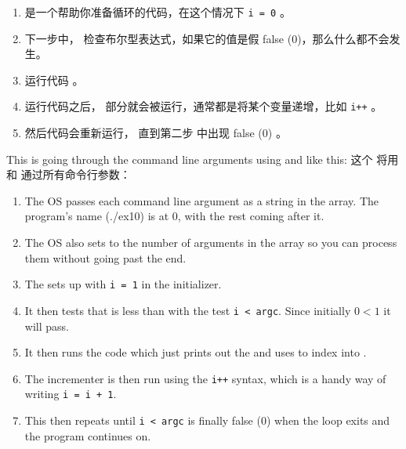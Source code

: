 \begin{enumerate}
\item {} 是一个帮助你准备循环的代码，在这个情况下 \verb|i = 0| 。
\item 下一步中，  检查布尔型表达式，如果它的值是假 false (0)，那么什么都不会发生。
\item 运行代码  。
\item 运行代码之后， 部分就会被运行，通常都是将某个变量递增，比如 \verb|i++| 。
\item 然后代码会重新运行， 直到第二步  中出现 false (0) 。
\end{enumerate}

This  is going through the command line arguments 
using  and  like this:
这个  将用  和  通过所有命令行参数：

\begin{enumerate}
\item The OS passes each command line argument as a string in the 
    array.  The program's name (./ex10) is at 0, with the rest coming after it.
\item The OS also sets  to the number of arguments in the 
    array so you can process them without going past the end.
\item The  sets up with \verb|i = 1| in the initializer.
\item It then tests that  is less than  with the
    test \verb|i < argc|. Since initially $0 < 1$ it will pass.
\item It then runs the code which just prints out the  and 
    uses  to index into .
\item The incrementer is then run using the \verb|i++| syntax, which is
    a handy way of writing \verb|i = i + 1|.
\item This then repeats until \verb|i < argc| is finally false (0) when
    the loop exits and the program continues on.
\end{enumerate}

